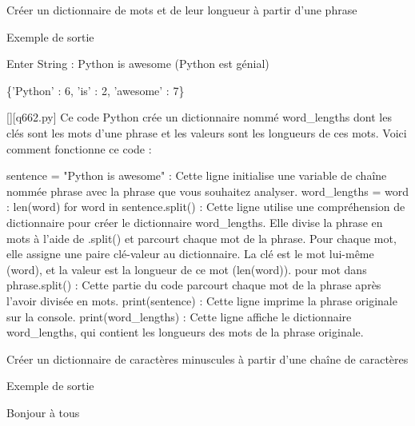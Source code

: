         \question
        Créer un dictionnaire de mots et de leur longueur à partir d'une phrase

Exemple de sortie

Enter String : Python is awesome (Python est génial)

\{'Python' : 6, 'is' : 2, 'awesome' : 7\}
        \par
        \begin{solution}
            \renewcommand{\nomfichier}{q662.py}
            \pythonfile{\chemincode \nomfichier}[][\nomfichier]
            Ce code Python crée un dictionnaire nommé word_lengths dont les clés sont les mots d'une phrase et les valeurs sont les longueurs de ces mots. Voici comment fonctionne ce code :

    sentence = "Python is awesome" : Cette ligne initialise une variable de chaîne nommée phrase avec la phrase que vous souhaitez analyser.
    word_lengths = {word : len(word) for word in sentence.split()} : Cette ligne utilise une compréhension de dictionnaire pour créer le dictionnaire word_lengths. Elle divise la phrase en mots à l'aide de .split() et parcourt chaque mot de la phrase. Pour chaque mot, elle assigne une paire clé-valeur au dictionnaire. La clé est le mot lui-même (word), et la valeur est la longueur de ce mot (len(word)).
        pour mot dans phrase.split() : Cette partie du code parcourt chaque mot de la phrase après l'avoir divisée en mots.
    print(sentence) : Cette ligne imprime la phrase originale sur la console.
    print(word_lengths) : Cette ligne affiche le dictionnaire word_lengths, qui contient les longueurs des mots de la phrase originale.
        \end{solution}
        

        \question
        Créer un dictionnaire de caractères minuscules à partir d'une chaîne de caractères

Exemple de sortie

Bonjour à tous

